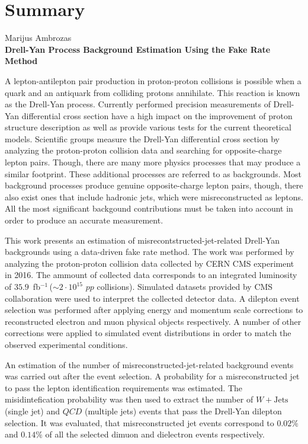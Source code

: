 \documentclass[a4paper, 12pt, oneside]{article}
\newcommand{\WJets}{W\! +\!\mathrm{Jets}}
\newcommand{\invfb}{fb$^{-1}\,$}
\newcommand{\QCD}{QC\! D}
\newlength\q
\begin{document}
\newpage
\section*{Summary}
\begin{centering}
Marijus Ambrozas\\
\textbf{Drell-Yan Process Background Estimation Using the Fake Rate Method}\\
\end{centering}
\vspace{0.5cm}

A lepton-antilepton pair production in proton-proton collisions is possible when a quark and an antiquark from colliding
protons annihilate.
This reaction is known as the Drell-Yan process.
Currently performed precision measurements of Drell-Yan differential cross section have a high impact on the improvement
of proton structure description as well as provide various tests for the current theoretical models.
Scientific groups measure the Drell-Yan differential cross section by analyzing the proton-proton collision data and
searching for opposite-charge lepton pairs.
Though, there are many more physics processes that may produce a similar footprint.
These additional processes are referred to as backgrounds.
Most background processes produce genuine opposite-charge lepton pairs, though, there also exist ones that include hadronic
jets, which were misreconstructed as leptons.
All the most significant backgound contributions must be taken into account in order to produce an accurate measurement.


This work presents an estimation of misrecontstructed-jet-related Drell-Yan backgrounds using a data-driven fake rate method.
The work was performed by analyzing the proton-proton collision data collected by CERN CMS experiment in 2016.
The ammount of collected data corresponds to an integrated luminosity of $35.9$~\invfb ($\sim\!2 \cdot 10^{15}$ $pp$ collisions).
Simulated datasets provided by CMS collaboration were used to interpret the collected detector data.
A dilepton event selection was performed after applying energy and momentum scale corrections to reconstructed electron and muon
physical objects respectively.
A number of other corrections were applied to simulated event distributions in order to match the observed experimental conditions.

An estimation of the number of misreconstructed-jet-related background events was carried out after the event selection.
A probability for a misreconstructed jet to pass the lepton identification requirements was estimated.
The misidintefication probability was then used to extract the number of $\WJets$ (single jet) and $\QCD$ (multiple jets)
events that pass the Drell-Yan dilepton selection.
It was evaluated, that misreconstructed jet events correspond to $0.02\%$ and $0.14\%$ of all the selected dimuon and dielectron
events respectively.
\end{document}
